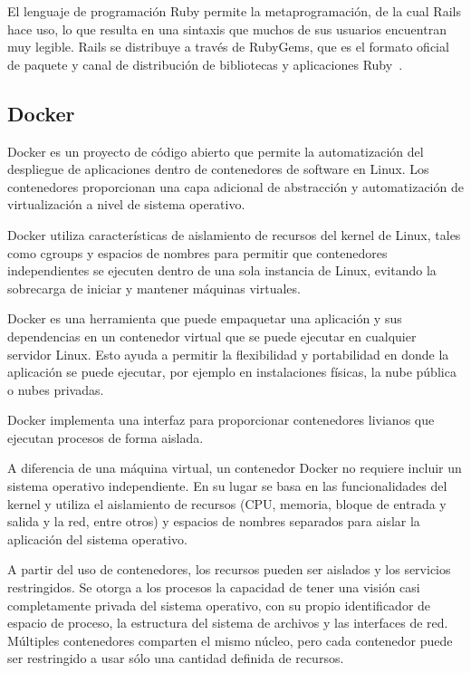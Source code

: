 El lenguaje de programación Ruby permite la metaprogramación, de la cual Rails
hace uso, lo que resulta en una sintaxis que muchos de sus usuarios encuentran
muy legible. Rails se distribuye a través de RubyGems, que es el formato
oficial de paquete y canal de distribución de bibliotecas y aplicaciones
Ruby~\cite{ror}.

\subsection{Docker}

Docker es un proyecto de código abierto que permite la automatización del
despliegue de aplicaciones dentro de contenedores de software en Linux. Los
contenedores proporcionan una capa adicional de abstracción y automatización de
virtualización a nivel de sistema operativo.

Docker utiliza características de aislamiento de recursos del kernel de Linux,
tales como cgroups y espacios de nombres para permitir que contenedores
independientes se ejecuten dentro de una sola instancia de Linux, evitando la
sobrecarga de iniciar y mantener máquinas virtuales.

Docker es una herramienta que puede empaquetar una aplicación y sus
dependencias en un contenedor virtual que se puede ejecutar en cualquier
servidor Linux. Esto ayuda a permitir la flexibilidad y portabilidad en donde
la aplicación se puede ejecutar, por ejemplo en instalaciones físicas, la nube
pública o nubes privadas.

Docker implementa una interfaz para proporcionar contenedores livianos que
ejecutan procesos de forma aislada.

A diferencia de una máquina virtual, un contenedor Docker no requiere incluir
un sistema operativo independiente. En su lugar se basa en las funcionalidades
del kernel y utiliza el aislamiento de recursos (CPU, memoria, bloque de
entrada y salida y la red, entre otros) y espacios de nombres separados para
aislar la aplicación del sistema operativo.

A partir del uso de contenedores, los recursos pueden ser aislados y los
servicios restringidos. Se otorga a los procesos la capacidad de tener una
visión casi completamente privada del sistema operativo, con su propio
identificador de espacio de proceso, la estructura del sistema de archivos y
las interfaces de red. Múltiples contenedores comparten el mismo núcleo, pero
cada contenedor puede ser restringido a usar sólo una cantidad definida de
recursos.


